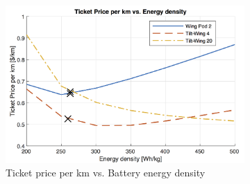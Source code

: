\begin{figure}[h]
\begin{subfigure}[t]{0.33\textwidth}
    \includegraphics[width=\textwidth]{Figures/Edens_TPrice_perkmNOPAD.png}
    \captionsetup{justification=centering}
    \caption{Ticket price per km vs. Battery energy density}
    \label{fig:sens6}
\end{subfigure}
\captionsetup{justification=centering}
\caption{}
\label{fig:sens456}
\end{figure}

